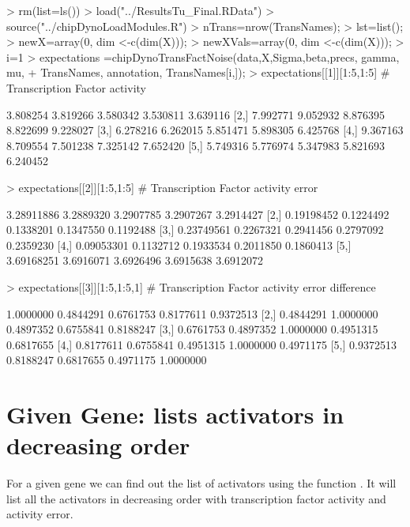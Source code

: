 \documentclass[11pt, a4paper, oneside]{article}
\begin{document}
\begin{Schunk}
\begin{Sinput}
> rm(list=ls())
> load("../ResultsTu_Final.RData")
> source("../chipDynoLoadModules.R")
> nTrans=nrow(TransNames);
> lst=list();
> newX=array(0, dim <-c(dim(X)));
> newXVals=array(0, dim <-c(dim(X)));
> i=1
> expectations =chipDynoTransFactNoise(data,X,Sigma,beta,precs, gamma, mu, 
+   					TransNames, annotation, TransNames[i,]);
> expectations[[1]][1:5,1:5] # Transcription Factor activity
\end{Sinput}
\begin{Soutput}
         [,1]     [,2]     [,3]     [,4]     [,5]
[1,] 3.808254 3.819266 3.580342 3.530811 3.639116
[2,] 7.992771 9.052932 8.876395 8.822699 9.228027
[3,] 6.278216 6.262015 5.851471 5.898305 6.425768
[4,] 9.367163 8.709554 7.501238 7.325142 7.652420
[5,] 5.749316 5.776974 5.347983 5.821693 6.240452
\end{Soutput}
\begin{Sinput}
> expectations[[2]][1:5,1:5] # Transcription Factor activity error
\end{Sinput}
\begin{Soutput}
           [,1]      [,2]      [,3]      [,4]      [,5]
[1,] 3.28911886 3.2889320 3.2907785 3.2907267 3.2914427
[2,] 0.19198452 0.1224492 0.1338201 0.1347550 0.1192488
[3,] 0.23749561 0.2267321 0.2941456 0.2797092 0.2359230
[4,] 0.09053301 0.1132712 0.1933534 0.2011850 0.1860413
[5,] 3.69168251 3.6916071 3.6926496 3.6915638 3.6912072
\end{Soutput}
\begin{Sinput}
> expectations[[3]][1:5,1:5,1] # Transcription Factor activity error difference
\end{Sinput}
\begin{Soutput}
          [,1]      [,2]      [,3]      [,4]      [,5]
[1,] 1.0000000 0.4844291 0.6761753 0.8177611 0.9372513
[2,] 0.4844291 1.0000000 0.4897352 0.6755841 0.8188247
[3,] 0.6761753 0.4897352 1.0000000 0.4951315 0.6817655
[4,] 0.8177611 0.6755841 0.4951315 1.0000000 0.4971175
[5,] 0.9372513 0.8188247 0.6817655 0.4971175 1.0000000
\end{Soutput}
\end{Schunk}


\section{Given Gene: lists activators in decreasing order}
For a given gene we can find out the list of activators using the function . It will list all the activators in decreasing order with transcription factor activity and activity error.
\end{document}
